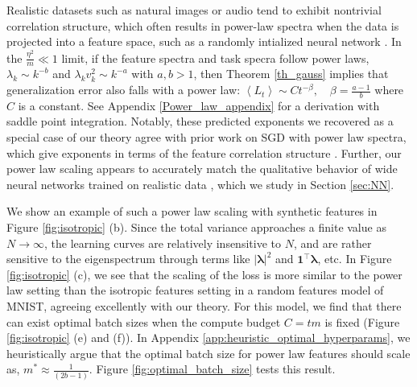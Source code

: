 \documentclass{article} %
\def\x{\bm x}
\def\w{\bm w}
\def\x{\mathbf x}
\def\w{\mathbf w}
\begin{document}
Realistic datasets such as natural images or audio tend to exhibit nontrivial correlation structure, which often results in power-law spectra when the data is projected into a feature space, such as a randomly intialized neural network \citep{Spigler_2020,Canatar2020SpectralBA, bahri2021explaining}. In the $\frac{\eta^2}{m} \ll 1$ limit, if the feature spectra and task specra follow power laws, $\lambda_k \sim k^{-b}$ and $\lambda_k v_k^2 \sim k^{-a}$ with $a, b > 1$, then Theorem \ref{th_gauss} implies that generalization error also falls with a power law: $\left< L_t \right> \sim C t^{- \beta }, \quad \beta = \frac{a-1}{b}$ where $C$ is a constant. See Appendix \ref{Power_law_appendix} for a derivation with saddle point integration. %
Notably, these predicted exponents we recovered as a special case of our theory agree with prior work on SGD with power law spectra, which give exponents in terms of the feature correlation structure \citep{berthier2020tight, dieuleveut, velikanov2021universal, varre2021iterate}.   Further, our power law scaling appears to accurately match the qualitative behavior of wide neural networks trained on realistic data \citep{hestness2017deep,bahri2021explaining}, which we study in Section \ref{sec:NN}.

We show an example of such a power law scaling with synthetic features in Figure \ref{fig:isotropic} (b). Since the total variance approaches a finite value as $N\to\infty$, the learning curves are relatively insensitive to $N$, and are rather sensitive to the eigenspectrum through terms like $|\bm\lambda|^2$ and $\bm 1^\top \bm\lambda$, etc. In Figure \ref{fig:isotropic} (c), we see that the scaling of the loss is more similar to the power law setting than the isotropic features setting in a random features model of MNIST, agreeing excellently with our theory. For this model, we find that there can exist optimal batch sizes when the compute budget $C = tm$ is fixed (Figure \ref{fig:isotropic} (e) and (f)). 
In  Appendix \ref{app:heuristic_optimal_hyperparams}, we heuristically argue that the optimal batch size for power law features should scale as, $m^* \approx \frac{1}{(2b-1)}$. Figure \ref{fig:optimal_batch_size} tests this result.  %
\end{document}

